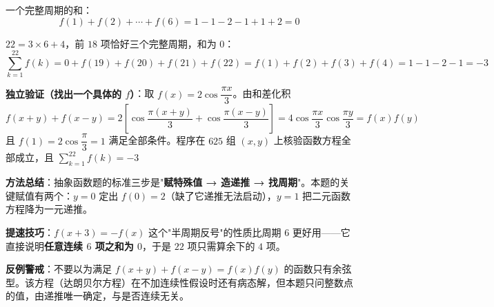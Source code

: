 \begin{answer}
一个完整周期的和：
\nopagebreak[4]
\[f(1)+f(2)+\cdots+f(6)=1-1-2-1+1+2=0\]

$22=3\times6+4$，前 $18$ 项恰好三个完整周期，和为 $0$：
\nopagebreak[4]
\[\sum_{k=1}^{22}f(k)=0+f(19)+f(20)+f(21)+f(22)=f(1)+f(2)+f(3)+f(4)=1-1-2-1=-3\]

\textbf{独立验证（找出一个具体的 $f$）}：取 $f(x)=2\cos\dfrac{\pi x}3$。由和差化积
\nopagebreak[4]
\[f(x+y)+f(x-y)=2\left[\cos\frac{\pi(x+y)}3+\cos\frac{\pi(x-y)}3\right]=4\cos\frac{\pi x}3\cos\frac{\pi y}3=f(x)f(y)\]
且 $f(1)=2\cos\dfrac\pi3=1$  满足全部条件。程序在 $625$ 组 $(x,y)$ 上核验函数方程全部成立，且 $\displaystyle\sum_{k=1}^{22}f(k)=-3$ 

\begin{gktip}
\textbf{方法总结}：抽象函数题的标准三步是"\textbf{赋特殊值 → 造递推 → 找周期}"。本题的关键赋值有两个：$y=0$ 定出 $f(0)=2$（缺了它递推无法启动），$y=1$ 把二元函数方程降为一元递推。

\textbf{提速技巧}：$f(x+3)=-f(x)$ 这个"半周期反号"的性质比周期 $6$ 更好用——它直接说明\textbf{任意连续 $6$ 项之和为 $0$}，于是 $22$ 项只需算余下的 $4$ 项。

\textbf{反例警戒}：不要以为满足 $f(x+y)+f(x-y)=f(x)f(y)$ 的函数只有余弦型。该方程（达朗贝尔方程）在不加连续性假设时还有病态解，但本题只问整数点的值，由递推唯一确定，与是否连续无关。
\end{gktip}


\par\medskip

\end{answer}

